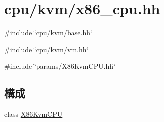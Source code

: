 \hypertarget{x86__cpu_8hh}{
\section{cpu/kvm/x86\_\-cpu.hh}
\label{x86__cpu_8hh}
}
{\ttfamily \#include \char`\"{}cpu/kvm/base.hh\char`\"{}}\par
{\ttfamily \#include \char`\"{}cpu/kvm/vm.hh\char`\"{}}\par
{\ttfamily \#include \char`\"{}params/X86KvmCPU.hh\char`\"{}}\par
\subsection*{構成}
\begin{DoxyCompactItemize}
\item 
class \hyperlink{classX86KvmCPU}{X86KvmCPU}
\end{DoxyCompactItemize}
